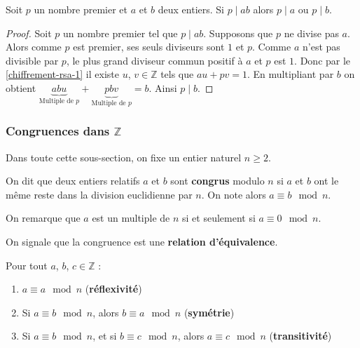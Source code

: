   \begin{lemma}
    \label{chiffrement-rsa-4}
    Soit $p$ un nombre premier et $a$ et $b$ deux entiers. Si $p \mid ab$ alors $p \mid a$ ou $p \mid b$.
  \end{lemma}

  \begin{proof}
    Soit $p$ un nombre premier tel que $p \mid ab$. Supposons que $p$ ne divise pas $a$. Alors comme $p$ est premier, ses seuls diviseurs sont $1$ et $p$. Comme $a$ n'est pas divisible par $p$, le plus grand diviseur commun positif à $a$ et $p$ est $1$. Donc par le \cref{chiffrement-rsa-1} il existe $u$, $v \in \mathbb{Z}$ tels que $au + pv = 1$. En multipliant par $b$ on obtient $\underbrace{abu}_{\text{Multiple de } p} + \underbrace{pbv}_{\text{Multiple de } p} = b$. Ainsi $p \mid b$.
  \end{proof}

  \subsubsection{Congruences dans $\mathbb{Z}$}

  Dans toute cette sous-section, on fixe un entier naturel $n \geq 2$.

  \begin{definition}
    On dit que deux entiers relatifs $a$ et $b$ sont \textbf{congrus} modulo $n$ si $a$ et $b$ ont le même reste dans la division euclidienne par $n$. On note alors $a \equiv b \mod n$.
  \end{definition}

  \begin{remark}
    \label{chiffrement-rsa-3}
    On remarque que $a$ est un multiple de $n$ si et seulement si $a \equiv 0 \mod n$.
  \end{remark}

  On signale que la congruence est une \textbf{relation d'équivalence}.

  \begin{proposition}
    Pour tout $a$, $b$, $c \in \mathbb{Z}$ :
    \begin{enumerate}[label={\bfseries(\roman*)}]
      \item $a \equiv a \mod n$ (\textbf{réflexivité})
      \item Si $a \equiv b \mod n$, alors $b \equiv a \mod n$ (\textbf{symétrie})
      \item Si $a \equiv b \mod n$, et si $b \equiv c \mod n$, alors $a \equiv c \mod n$ (\textbf{transitivité})
    \end{enumerate}
  \end{proposition}

